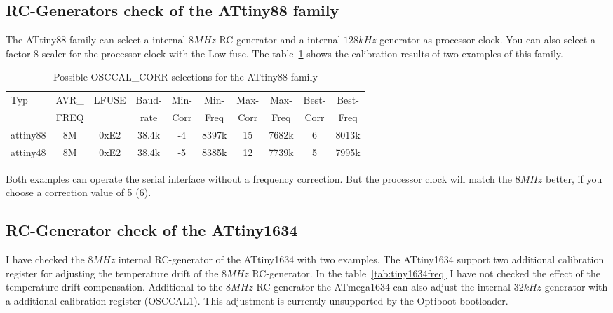\subsection{RC-Generators check of the ATtiny88 family}

The ATtiny88 family can select a internal \(8MHz\) RC-generator and a
internal \(128kHz\) generator as processor clock.
You can also select a factor 8 scaler for the processor clock with the Low-fuse.
The table~\ref{tab:tiny88freq} shows the calibration results of two examples of this family.

\begin{table}[H]
  \begin{center}
    \begin{tabular}{| l | c | c | c || c | c || c | c || c | c |}
    \hline
   Typ  &       AVR\_ & LFUSE & Baud- & Min- & Min- & Max- & Max- & Best- & Best-  \\
        &       FREQ  &       & rate & Corr & Freq & Corr & Freq  & Corr  & Freq  \\
    \hline
    \hline
attiny88 &          8M & 0xE2  & 38.4k &  -4  & 8397k & 15  & 7682k  & 6  & 8013k \\
    \hline
attiny48 &         8M & 0xE2  & 38.4k &  -5  & 8385k & 12  & 7739k  & 5  & 7995k \\
    \hline
    \end{tabular}
  \end{center}
  \caption{Possible OSCCAL\_CORR selections for the ATtiny88 family}
  \label{tab:tiny88freq}
\end{table}

Both examples can operate the serial interface without a frequency correction.
But the processor clock will match the \(8MHz\) better, if you choose
a correction value of 5 (6).

\subsection{RC-Generator check of the ATtiny1634}

I have checked the \(8MHz\) internal RC-generator of the ATtiny1634
with two examples.
The ATtiny1634 support two additional calibration register for adjusting the
temperature drift of the \(8MHz\) RC-generator.
In the table~\ref{tab:tiny1634freq} I have not checked the effect of
the temperature drift compensation.
Additional to the \(8MHz\) RC-generator the ATmega1634 can also adjust
the internal \(32kHz\) generator with a additional calibration register (OSCCAL1).
This adjustment is currently unsupported by the Optiboot bootloader.

